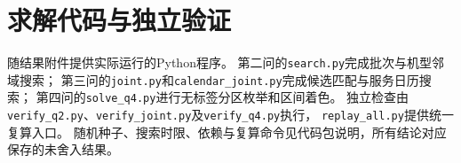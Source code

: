 \section{求解代码与独立验证}
随结果附件提供实际运行的Python程序。
第二问的\texttt{search.py}完成批次与机型邻域搜索；
第三问的\texttt{joint.py}和\texttt{calendar\_joint.py}完成候选匹配与服务日历搜索；
第四问的\texttt{solve\_q4.py}进行无标签分区枚举和区间着色。
独立检查由\texttt{verify\_q2.py}、\texttt{verify\_joint.py}及\texttt{verify\_q4.py}执行，
\texttt{replay\_all.py}提供统一复算入口。
随机种子、搜索时限、依赖与复算命令见代码包说明，所有结论对应保存的未舍入结果。
